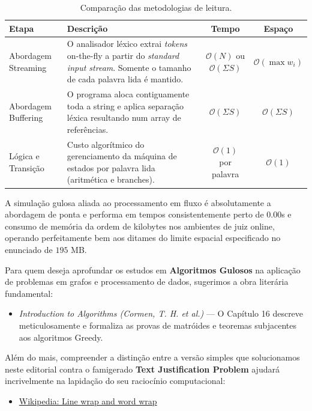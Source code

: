 \documentclass[11pt]{article}
\begin{document}
\begin{table}[h!]
\centering
\begin{tabularx}{\textwidth}{l X c c}
\toprule
\textbf{Etapa} & \textbf{Descrição} & \textbf{Tempo} & \textbf{Espaço} \\
\midrule
Abordagem Streaming & O analisador léxico extrai \textit{tokens} on-the-fly a partir do \textit{standard input stream}. Somente o tamanho de cada palavra lida é mantido. & $\mathcal{O}(N)$ ou $\mathcal{O}(\Sigma S)$ & $\mathcal{O}(\max w_i)$ \\
\midrule
Abordagem Buffering & O programa aloca contiguamente toda a string e aplica separação léxica resultando num array de referências. & $\mathcal{O}(\Sigma S)$ & $\mathcal{O}(\Sigma S)$ \\
\midrule
Lógica e Transição & Custo algorítmico do gerenciamento da máquina de estados por palavra lida (aritmética e branches). & $\mathcal{O}(1)$ por palavra & $\mathcal{O}(1)$ \\
\bottomrule
\end{tabularx}
\caption{Comparação das metodologias de leitura.}
\end{table}

A simulação gulosa aliada ao processamento em fluxo é absolutamente a abordagem de ponta e performa em tempos consistentemente perto de 0.00s e consumo de memória da ordem de kilobytes nos ambientes de juiz online, operando perfeitamente bem aos ditames do limite espacial especificado no enunciado de $195$ MB.

\vspace{1.5em}

\begin{notebox}
Para quem deseja aprofundar os estudos em \textbf{Algoritmos Gulosos} na aplicação de problemas em grafos e processamento de dados, sugerimos a obra literária fundamental: 
\begin{itemize}
    \item \textit{Introduction to Algorithms (Cormen, T. H. et al.)} — O Capítulo 16 descreve meticulosamente e formaliza as provas de matróides e teoremas subjacentes aos algoritmos Greedy.
\end{itemize}
Além do mais, compreender a distinção entre a versão simples que solucionamos neste editorial contra o famigerado \textbf{Text Justification Problem} ajudará incrivelmente na lapidação do seu raciocínio computacional:
\begin{itemize}
    \item \href{https://en.wikipedia.org/wiki/Line_wrap_and_word_wrap}{Wikipedia: Line wrap and word wrap}
\end{itemize}
\end{notebox}

\vfill
{}
\end{document}
